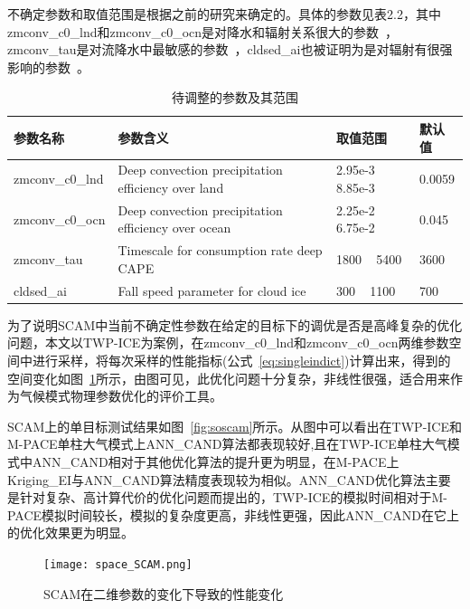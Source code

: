不确定参数和取值范围是根据之前的研究来确定的\cite{qian2015parametric,zhang2015automatic}。具体的参数见表2.2，其中zmconv\_c0\_lnd和zmconv\_c0\_ocn是对降水和辐射关系很大的参数~\cite{qian2018parametric}，zmconv\_tau是对流降水中最敏感的参数~\cite{yang2013uncertainty}，cldsed\_ai也被证明为是对辐射有很强影响的参数~\cite{mitchell2008impact}。
     
\begin{table}[H]
\centering
\caption{待调整的参数及其范围}  
\begin{tabular}{llll}  
\toprule[1.5pt]
\centering
参数名称 & 参数含义 &取值范围  & 默认值 \\  
\hline  
zmconv\_c0\_lnd & Deep convection precipitation efficiency over land & 2.95e-3 ~ 8.85e-3 & 0.0059 \\
    zmconv\_c0\_ocn & Deep convection precipitation efficiency over ocean & 2.25e-2 ~ 6.75e-2 & 0.045 \\
    zmconv\_tau & Timescale for consumption rate deep CAPE & 1800 ~ 5400 & 3600 \\
    cldsed\_ai & Fall speed parameter for cloud ice & 300 ~ 1100 & 700 \\

\bottomrule[1.5pt]  
\end{tabular}
\end{table}  

为了说明SCAM中当前不确定性参数在给定的目标下的调优是否是高峰复杂的优化问题，本文以TWP-ICE为案例，在zmconv\_c0\_lnd和zmconv\_c0\_ocn两维参数空间中进行采样，将每次采样的性能指标(公式~\ref{eq:singleindict})计算出来，得到的空间变化如图~\ref{fig:soscamspace}所示，由图可见，此优化问题十分复杂，非线性很强，适合用来作为气候模式物理参数优化的评价工具。

SCAM上的单目标测试结果如图~\ref{fig:soscam}所示。从图中可以看出在TWP-ICE和M-PACE单柱大气模式上ANN\_CAND算法都表现较好,且在TWP-ICE单柱大气模式中ANN\_CAND相对于其他优化算法的提升更为明显，在M-PACE上Kriging\_EI与ANN\_CAND算法精度表现较为相似。ANN\_CAND优化算法主要是针对复杂、高计算代价的优化问题而提出的，TWP-ICE的模拟时间相对于M-PACE模拟时间较长，模拟的复杂度更高，非线性更强，因此ANN\_CAND在它上的优化效果更为明显。   
\begin{figure}[H] %
  \centering
  \texttt{[image: space\_SCAM.png]}
  \caption{SCAM在二维参数的变化下导致的性能变化}
  \label{fig:soscamspace}
\end{figure}    

